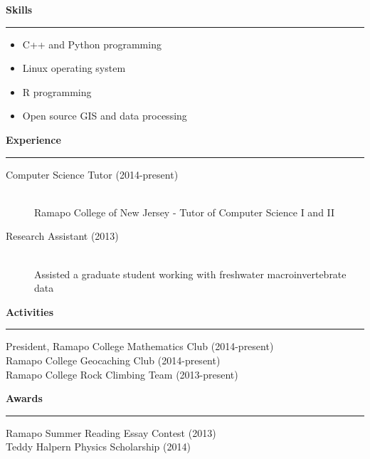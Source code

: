 \documentclass[letterpaper,10pt]{article}
\begin{document}
 \vspace{4 mm}
  
 \large
 \textbf{Skills}
 \vspace{1 mm}
 \hrule
 \normalsize
 
 \begin{multicols}{2}
  \begin{itemize}
   \item C++ and Python programming
   \item Linux operating system
   \item R programming
   \item Open source GIS and data processing
  \end{itemize}
 \end{multicols}
 
 \vspace{4 mm}

 \large
 \textbf{Experience}
 \vspace{1 mm}
 \hrule
 \normalsize
 
 \begin{description}
  \item[Computer Science Tutor (2014-present)] \hfill \\
   Ramapo College of New Jersey - Tutor of Computer Science I and II
   
  \item[Research Assistant (2013)] \hfill \\
   Assisted a graduate student working with freshwater macroinvertebrate data
 \end{description}
 
 \vspace{4 mm}

 \large
 \textbf{Activities}
 \vspace{1 mm}
 \hrule
 \normalsize
 
 \begin{description}
  \item[President, Ramapo College Mathematics Club (2014-present)]
  \item[Ramapo College Geocaching Club (2014-present)]
  \item[Ramapo College Rock Climbing Team (2013-present)]
 \end{description}
 
 \large
 \textbf{Awards}
 \vspace{1 mm}
 \hrule
 \normalsize
 
 \begin{description}
  \item[Ramapo Summer Reading Essay Contest (2013)]
  \item[Teddy Halpern Physics Scholarship (2014)]
 \end{description}
\end{document}
